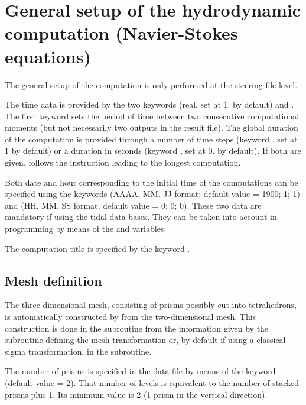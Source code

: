 \chapter{General setup of the hydrodynamic computation (Navier-Stokes equations)}

The general setup of the computation is only performed at the steering file
level.

The time data is provided by the two keywords  (real, set at
1. by default) and . The first keyword sets the
period of time between two consecutive computational moments (but not
necessarily two outputs in the result file). The global duration of the
computation is provided through a number of time steps (keyword , set at 1 by default) or a duration in seconds (keyword
, set at 0. by default). If both are given,  follows
the instruction leading to the longest computation.

Both date and hour corresponding to the initial time of the computations can be
specified using the keywords 
(AAAA, MM, JJ format; default value = 1900; 1; 1) and  (HH, MM, SS format, default value = 0; 0; 0).
These two data are mandatory if using the tidal data bases.
They can be taken into account in programming by means of the 
and  variables.

The computation title is specified by the keyword .


\section{Mesh definition}

The three-dimensional mesh, consisting of prisms possibly cut into
tetrahedrons, is automatically constructed by  from the
two-dimensional mesh. This construction is done in the subroutine
 from the information given by the subroutine defining the
mesh transformation  or, by default if using a
classical sigma transformation, in the  subroutine.

The number of prisms is specified in the data file by means of the keyword
 (default value = 2). That number of levels
is equivalent to the number of stacked prisms plus 1. Its minimum value is 2 (1
prism in the vertical direction).

